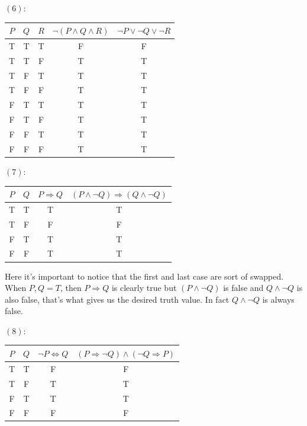 \begin{solution}
    $(6)$: 
    \begin{table}[H]
        \centering
        \begin{tabular}{ccccc}
            \toprule
            $P$ & $Q$ & $R$ & $\neg(P\land Q\land R)$ & $\neg P\lor \neg Q\lor \neg R$\\
            \midrule
            T & T & T & F & F\\
            T & T & F & T & T\\
            T & F & T & T & T\\
            T & F & F & T & T\\
            F & T & T & T & T\\
            F & T & F & T & T\\
            F & F & T & T & T\\
            F & F & F & T & T\\
            \bottomrule
        \end{tabular}
    \end{table}

    $(7)$: 
    \begin{table}[H]
        \centering
        \begin{tabular}{cccc}
            \toprule
            $P$ & $Q$ & $P\Rightarrow Q$ & $(P\land \neg Q)\Rightarrow (Q\land\neg Q)$\\
            \midrule
            T & T & T & T\\
            T & F & F & F\\
            F & T & T & T\\
            F & F & T & T\\
            \bottomrule
        \end{tabular}
    \end{table}
    Here it's important to notice that the first and last case are sort of swapped. When $P,Q=T$, then $P\Rightarrow Q$ is clearly true but $(P\land \neg Q)$ is false and $Q\land\neg Q$ is also false, that's what gives us the desired truth value. In fact $Q\land\neg Q$ is always false. 

    $(8)$: 
    \begin{table}[H]
        \centering
        \begin{tabular}{cccc}
            \toprule
            $P$ & $Q$ & $\neg P\Leftrightarrow Q$ & $(P\Rightarrow \neg Q)\land (\neg Q\Rightarrow P)$\\
            \midrule
            T & T & F & F\\
            T & F & T & T\\
            F & T & T & T\\
            F & F & F & F\\
            \bottomrule
        \end{tabular}
    \end{table}
\end{solution}

